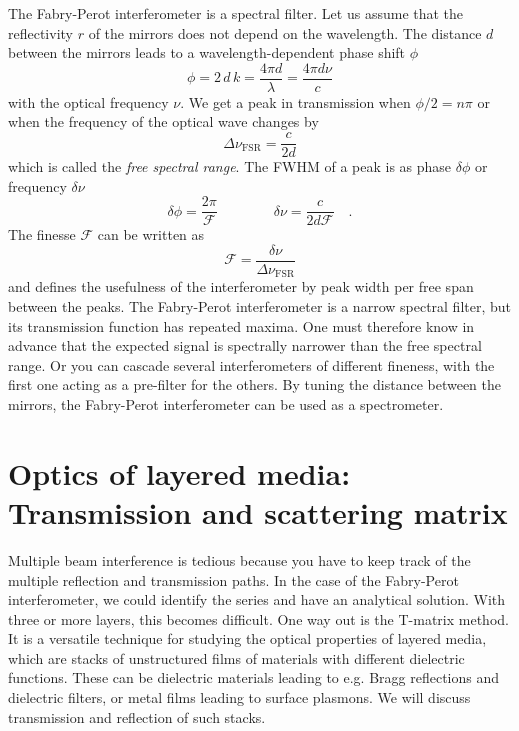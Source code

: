 The Fabry-Perot interferometer is a spectral filter. Let us assume that the reflectivity $r$ of the mirrors does not depend on the wavelength. The distance $d$ between the mirrors leads to a wavelength-dependent phase shift $\phi$
\begin{equation}
  \phi = 2 \, d \, k = \frac{4 \pi d}{\lambda} =  \frac{4 \pi d  \nu}{c}
\end{equation}
with the optical frequency $\nu$. We get a peak in transmission when $\phi/2  = n \pi$ or when the frequency of the optical wave changes by 
\begin{equation}
  \Delta \nu_\text{FSR} = \frac{c}{2d}
\end{equation}
which is called the \emph{free spectral range}. The FWHM of a peak is as phase $ \delta \phi $ or frequency $ \delta \nu$ 
\begin{equation}
  \delta \phi = \frac{2 \pi }{\mathcal{F}} \qquad\qquad \delta \nu = \frac{c}{2 d \mathcal{F}}  \quad .
\end{equation}
The finesse $\mathcal{F}$ can be written as
\begin{equation}
  \mathcal{F} = \frac{ \delta \nu}{ \Delta \nu_\text{FSR}}
\end{equation}
and defines the usefulness of the interferometer by peak width per free span between the peaks. The Fabry-Perot interferometer is a narrow spectral filter, but its transmission function has repeated maxima. One must therefore know in advance that the expected signal is spectrally narrower than the free spectral range. Or you can cascade several interferometers of different fineness, with the first one acting as a pre-filter for the others. By tuning the distance between the mirrors, the Fabry-Perot interferometer can be used as a spectrometer.


\section{Optics of layered media: Transmission and scattering matrix}

Multiple beam interference is tedious because you have to keep track of the multiple reflection and transmission paths. In the case of the Fabry-Perot interferometer, we could identify the series and have an analytical solution. With three or more layers, this becomes difficult. One way out is the T-matrix method. It is a versatile technique for studying the optical properties of layered media, which are stacks of unstructured films of materials with different dielectric functions. These can be dielectric materials leading to e.g. Bragg reflections and dielectric filters, or metal films leading to surface plasmons. We will discuss transmission and reflection of such stacks.

